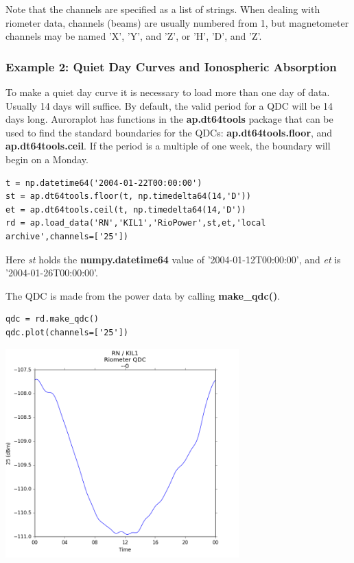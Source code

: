 \documentclass{article}
\begin{document}
Note that the channels are specified as a list of strings. When dealing with riometer data, channels (beams) are usually numbered from 1, but magnetometer channels may be named 'X', 'Y', and 'Z', or 'H', 'D', and 'Z'.


\subsubsection{Example 2: Quiet Day Curves and Ionospheric Absorption}

To make a quiet day curve it is necessary to load more than one day of data. Usually 14 days will suffice. By default, the valid period for a QDC will be 14 days long.
Auroraplot has functions in the {\bf ap.dt64tools} package that can be used to find the standard boundaries for the QDCs: {\bf ap.dt64tools.floor}, and {\bf ap.dt64tools.ceil}. If the period is a multiple of one week, the boundary will begin on a Monday.

\begin{lstlisting}[style=pythonstyle]
t = np.datetime64('2004-01-22T00:00:00')
st = ap.dt64tools.floor(t, np.timedelta64(14,'D'))
et = ap.dt64tools.ceil(t, np.timedelta64(14,'D'))
rd = ap.load_data('RN','KIL1','RioPower',st,et,'local archive',channels=['25'])
\end{lstlisting}

\noindent Here {\it st} holds the {\bf numpy.datetime64} value of '2004-01-12T00:00:00', and {\it et} is '2004-01-26T00:00:00'.

The QDC is made from the power data by calling {\bf make\_qdc()}.

\begin{lstlisting}[style=pythonstyle]
qdc = rd.make_qdc()
qdc.plot(channels=['25'])
\end{lstlisting}

\begin{center}
\includegraphics[width=9cm]{images/figure_2.png}
\end{center}
\end{document}
